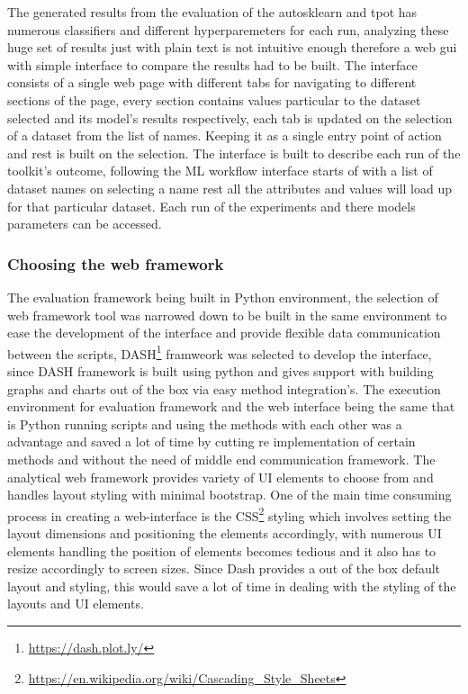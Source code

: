 The generated results from the evaluation of the autosklearn and tpot has numerous classifiers and different hyperparemeters for each run, analyzing these huge set of results just with plain text is not intuitive enough therefore a web gui with simple interface to compare the results had to be built. The interface consists of a single web page with different tabs for navigating to different sections of the page, every section contains values particular to the dataset selected and its model's results respectively, each tab is updated on the selection of a dataset from the list of names.
Keeping it as a single entry point of action and rest is built on the selection. The interface is built to describe each run of the toolkit's outcome, following the ML workflow interface starts of with a list of dataset names on selecting a name rest all the attributes and values will load up for that particular dataset. Each run of the experiments and there models parameters can be accessed.

\subsubsection{Choosing the web framework}
The evaluation framework being built in Python environment, the selection of web framework tool was narrowed down to be built in the same environment to ease the development of the interface and provide flexible data communication between the scripts, DASH\footnote{\url{https://dash.plot.ly/}} framweork was selected to develop the interface, since DASH framework is built using python and gives support with building graphs and charts out of the box via easy method integration's. The execution environment for evaluation framework and the web interface being the same that is Python running scripts and using the methods with each other was a advantage and saved a lot of time by cutting re implementation of certain methods and without the need of middle end communication framework. The analytical web framework provides variety of UI elements to choose from and handles layout styling with minimal bootstrap. One of the main time consuming process in creating a web-interface is the CSS\footnote{\url{https://en.wikipedia.org/wiki/Cascading_Style_Sheets}} styling which involves setting the layout dimensions and positioning the elements accordingly, with numerous UI elements handling the position of elements becomes tedious and it also has to resize accordingly to screen sizes. Since Dash provides a out of the box default layout and styling, this would save a lot of time in dealing with the styling of the layouts and UI elements.

